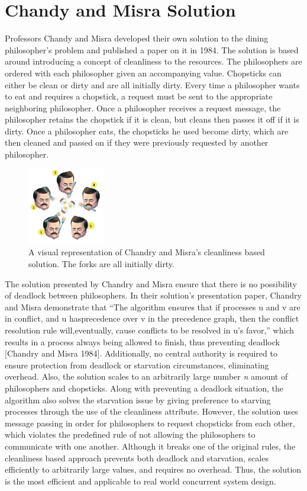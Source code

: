 \documentclass{article}
\begin{document}
\section{Chandy and Misra Solution} Professors Chandy and Misra developed their own solution to the dining philosopher's problem and published a paper on it in 1984. The solution is based around introducing a concept of cleanliness to the resources. The philosophers are ordered with each philosopher given an accompanying value. Chopsticks can either be clean or dirty and are all initially dirty. Every time a philosopher wants to eat and requires a chopstick, a request must be sent to the appropriate neighboring philosopher. Once a philosopher receives a request message, the philosopher retains the chopstick if it is clean, but cleans then passes it off if it is dirty. Once a philosopher eats, the chopsticks he used become dirty, which are then cleaned and passed on if they were previously requested by another philosopher.

\begin{figure}[H]
\begin{center}
\includegraphics[width=0.3\textwidth]{clean.png}
\caption{A visual representation of Chandry and Misra's cleanliness based solution. The forks are all initially dirty.}
\end{center}
\end{figure}

The solution presented by Chandry and Misra ensure that there is no possibility of deadlock between philosophers. In their solution's presentation paper, Chandry and Misra demonstrate that ``The algorithm ensures that if processes u and v are in conflict, and u hasprecedence over v in the precedence graph, then the conflict resolution rule will,eventually, cause conflicts to be resolved in u's favor,'' which results in a process always being allowed to finish, thus preventing deadlock [Chandry and Misra 1984]. Additionally, no central authority is required to ensure protection from deadlock or starvation circumstances, eliminating overhead. Also, the solution scales to an arbitrarily large number \emph{n} amount of philosophers and chopsticks. Along with preventing a deadlock situation, the algorithm also solves the starvation issue by giving preference to starving processes through the use of the cleanliness attribute. However, the solution uses message passing in order for philosophers to request chopsticks from each other, which violates the predefined rule of not allowing the philosophers to communicate with one another. Although it breaks one of the original rules, the cleanliness based approach prevents both deadlock and starvation, scales efficiently to arbitrarily large values, and requires no overhead. Thus, the solution is the most efficient and applicable to real world concurrent system design.
\end{document}
